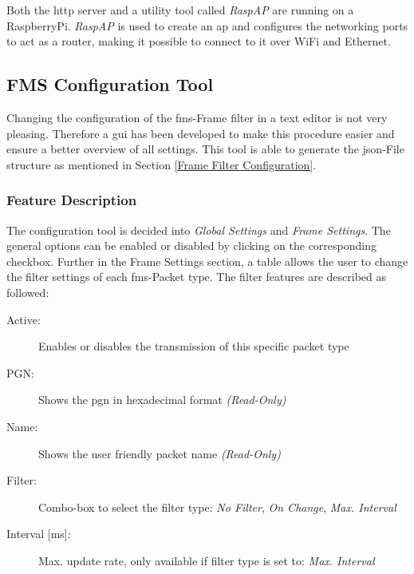 Both the \acrshort{http} server and a utility tool called \textit{RaspAP} are running on a Raspberry\;Pi. \textit{RaspAP} is used to create an \acrlong{ap} and configures the networking ports to act as a router, making it possible to connect to it over WiFi and Ethernet.
\newpage

\newpage
\subsection{FMS Configuration Tool}
Changing the configuration of the \acrshort{fms}-Frame filter in a text editor is not very pleasing. Therefore a \acrfull{gui} has been developed to make this procedure easier and ensure a better overview of all settings. This tool is able to generate the \acrshort{json}-File structure as mentioned in Section \ref{Frame Filter Configuration}.

\subsubsection{Feature Description}
The configuration tool is decided into \textit{Global Settings} and \textit{Frame Settings}. The general options can be enabled or disabled by clicking on the corresponding checkbox. Further in the Frame Settings section, a table allows the user to change the filter settings of each \acrshort{fms}-Packet type. The filter features are described as followed:

\begin{description}
  \item[Active:] Enables or disables the transmission of this specific packet type
  \item[PGN:] Shows the \acrlong{pgn} in hexadecimal format \textit{(Read-Only)}
  \item[Name:] Shows the user friendly packet name \textit{(Read-Only)}
  \item[Filter:] Combo-box to select the filter type: \textit{No Filter}, \textit{On Change}, \textit{Max. Interval}
  \item[{Interval [ms]:}] Max. update rate, only available if filter type is set to: \textit{Max. Interval}
\end{description}

